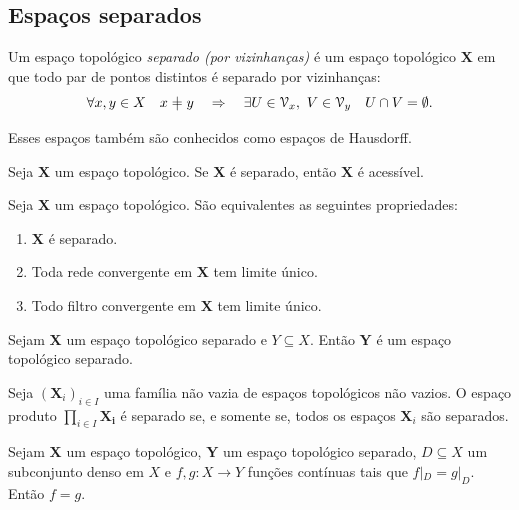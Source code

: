 \subsection{Espaços separados}

\begin{definition}[$T_2$]
Um espaço topológico \emph{separado (por vizinhanças)} é um espaço topológico $\bm X$ em que todo par de pontos distintos é separado por vizinhanças:
	\begin{equation*}
	\forall x,y \in X \quad x \neq y \quad \Rightarrow \quad \exists U \in \viz_x,\ V \in \viz_y \quad U \cap V = \emptyset.
	\end{equation*}
\end{definition}
Esses espaços também são conhecidos como espaços de Hausdorff.

\begin{proposition}[$T_2 \Rightarrow T_1$]
Seja $\bm X$ um espaço topológico. Se $\bm X$ é separado, então $\bm X$ é acessível.
\end{proposition}

\begin{proposition}
Seja $\bm X$ um espaço topológico. São equivalentes as seguintes propriedades:
	\begin{enumerate}
	\item $\bm X$ é separado.
	\item Toda rede convergente em $\bm X$ tem limite único.
	\item Todo filtro convergente em $\bm X$ tem limite único.
	\end{enumerate}
\end{proposition}

\begin{proposition}
Sejam $\bm X$ um espaço topológico separado e $Y \subseteq X$. Então $\bm Y$ é um espaço topológico separado.
\end{proposition}

\begin{proposition}
Seja $(\bm X_i)_{i \in I}$ uma família não vazia de espaços topológicos não vazios. O espaço produto $\prod_{i \in I} \bm{X_i}$ é separado se, e somente se, todos os espaços $\bm X_i$ são separados.
\end{proposition}

\begin{proposition}
Sejam $\bm X$ um espaço topológico, $\bm Y$ um espaço topológico separado, $D \subseteq X$ um subconjunto denso em $X$ e $f,g: X \to Y$ funções contínuas tais que $f|_D=g|_D$. Então $f=g$.
\end{proposition}

